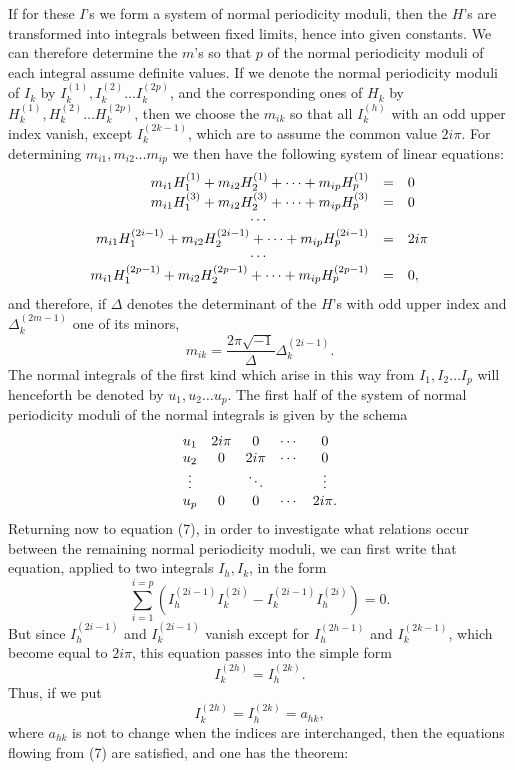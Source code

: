 \documentclass[10pt]{article}
\begin{document}
If for these \(I\)'s we form a system of normal periodicity moduli, then the \(H\)'s are transformed into integrals between fixed limits, hence into given constants. We can therefore determine the \(m\)'s so that \(p\) of the normal periodicity moduli of each integral assume definite values. If we denote the normal periodicity moduli of \(I_k\) by \(I_k^{(1)}, I_k^{(2)}\ldots I_k^{(2p)}\), and the corresponding ones of \(H_k\) by \(H_k^{(1)}, H_k^{(2)}\ldots H_k^{(2p)}\), then we choose the \(m_{ik}\) so that all \(I_k^{(h)}\) with an odd upper index vanish, except \(I_k^{(2k-1)}\), which are to assume the common value \(2i\pi\). For determining \(m_{i1},m_{i2}\ldots m_{ip}\) we then have the following system of linear equations:
\[
\begin{array}{rcl}
m_{i1}H_1^{(1)}+m_{i2}H_2^{(1)}+\cdots+m_{ip}H_p^{(1)}&=&0\\
m_{i1}H_1^{(3)}+m_{i2}H_2^{(3)}+\cdots+m_{ip}H_p^{(3)}&=&0\\
\multicolumn{3}{c}{\cdots}\\
m_{i1}H_1^{(2i-1)}+m_{i2}H_2^{(2i-1)}+\cdots+m_{ip}H_p^{(2i-1)}&=&2i\pi\\
\multicolumn{3}{c}{\cdots}\\
m_{i1}H_1^{(2p-1)}+m_{i2}H_2^{(2p-1)}+\cdots+m_{ip}H_p^{(2p-1)}&=&0,
\end{array}
\]
and therefore, if \(\Delta\) denotes the determinant of the \(H\)'s with odd upper index and \(\Delta_k^{(2m-1)}\) one of its minors,
\[
m_{ik}=\frac{2\pi\sqrt{-1}}{\Delta}\Delta_k^{(2i-1)}.
\]
The normal integrals of the first kind which arise in this way from \(I_1,I_2\ldots I_p\) will henceforth be denoted by \(u_1,u_2\ldots u_p\). The first half of the system of normal periodicity moduli of the normal integrals is given by the schema
\[
\begin{array}{c@{\quad}cccc}
u_1&2i\pi&0&\cdots&0\\
u_2&0&2i\pi&\cdots&0\\
\vdots&&\ddots&&\vdots\\
u_p&0&0&\cdots&2i\pi.
\end{array}
\]
Returning now to equation (7), in order to investigate what relations occur between the remaining normal periodicity moduli, we can first write that equation, applied to two integrals \(I_h,I_k\), in the form
\[
\sum_{i=1}^{i=p}\left(I_h^{(2i-1)}I_k^{(2i)}-I_k^{(2i-1)}I_h^{(2i)}\right)=0.
\]
But since \(I_h^{(2i-1)}\) and \(I_k^{(2i-1)}\) vanish except for \(I_h^{(2h-1)}\) and \(I_k^{(2k-1)}\), which become equal to \(2i\pi\), this equation passes into the simple form
\[
I_k^{(2h)}=I_h^{(2k)}.
\]
Thus, if we put
\[
I_k^{(2h)}=I_h^{(2k)}=a_{hk},
\]
where \(a_{hk}\) is not to change when the indices are interchanged, then the equations flowing from (7) are satisfied, and one has the theorem:
\end{document}
